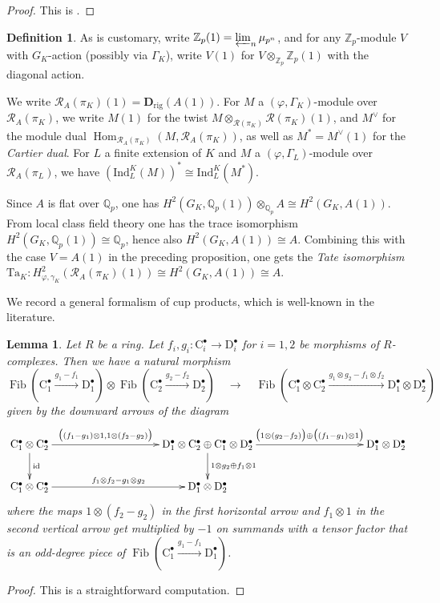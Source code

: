 \documentclass[12pt]{article}
\newtheorem{lemma}[theorem]{Lemma}
\theoremstyle{definition}
\newtheorem{defn}[theorem]{Definition}
\numberwithin{equation}{theorem}
\newcommand{\calR}{\mathcal{R}}
\newcommand{\QQ}{\mathbb{Q}}
\newcommand{\ZZ}{\mathbb{Z}}
\newcommand{\dual}{\vee}
\newcommand{\bbD}{\mathbf{D}}
\newcommand{\rmC}{\mathrm{C}}
\newcommand{\rmD}{\mathrm{D}}
\newcommand{\id}{\mathrm{id}}
\newcommand{\Ind}{\mathrm{Ind}}
\def\Qp{\QQ_p}
\newcommand{\rig}{\mathrm{rig}}
\newcommand{\Ta}{\mathrm{Ta}}
\newcommand{\Zp}{\ZZ_p}
\DeclareMathOperator{\Fib}{Fib}
\DeclareMathOperator{\Hom}{Hom}
\begin{document}
\begin{proof}
This is \cite[Theorem~2.8]{pottharst1}.
\end{proof}

\begin{defn}
As is customary, write $\Zp(1) = \varprojlim_n \mu_{p^n}$, and for any
$\Zp$-module $V$ with $G_K$-action (possibly via $\Gamma_K$), write
$V(1)$ for $V \otimes_{\Zp} \Zp(1)$ with the diagonal action.

We write $\calR_A(\pi_K)(1) = \bbD_\rig(A(1))$.  For $M$ a $(\varphi,
\Gamma_K)$-module over $\calR_A(\pi_K)$, we write $M(1)$ for the twist
$M \otimes_{\calR(\pi_K)} \calR(\pi_K)(1)$, and $M^\dual$ for the
module dual $\Hom_{\calR_A(\pi_K)}(M, \calR_A(\pi_K))$, as well as
$M^* = M^\dual(1)$ for the \emph{Cartier dual}.  For $L$ a finite
extension of $K$ and $M$ a $(\varphi, \Gamma_L)$-module over
$\calR_A(\pi_L)$, we have $(\Ind_L^K(M))^* \cong \Ind_L^K(M^*)$.

Since $A$ is flat over $\Qp$, one has $H^2(G_K,\Qp(1)) \otimes_{\Qp} A
\cong H^2(G_K,A(1))$.  From local class field theory one has the trace
isomorphism $H^2(G_K,\Qp(1)) \cong \Qp$, hence also $H^2(G_K,A(1))
\cong A$.  Combining this with the case $V = A(1)$ in the preceding
proposition, one gets the \emph{Tate isomorphism} $\Ta_K:
H^2_{\varphi,\gamma_K}(\calR_A(\pi_K)(1)) \cong H^2(G_K,A(1)) \cong
A$.
\end{defn}

We record a general formalism of cup products, which is well-known in the literature.

\begin{lemma}
\label{L:cup product}
Let $R$ be a ring.  Let $f_i, g_i: \rmC_i^\bullet \to \rmD_i^\bullet$ for $i = 1,2$ be morphisms of $R$-complexes.  Then we have a natural morphism 
\[
\Fib(\rmC_1^\bullet \xrightarrow{g_1 - f_1} \rmD_1^\bullet) \otimes \Fib(\rmC_2^\bullet \xrightarrow{g_2 - f_2} \rmD_2^\bullet) \quad \longrightarrow \quad \Fib(\rmC_1^\bullet \otimes \rmC_2^\bullet \xrightarrow{g_1 \otimes g_2 - f_1 \otimes f_2} \rmD_1^\bullet \otimes \rmD_2^\bullet)
\]
given by the downward arrows of the diagram
\[
\xymatrix@C=3.5cm{
\rmC_1^\bullet \otimes \rmC_2^\bullet \ar[r]^-{\big((f_1-g_1) \otimes 1 , 1 \otimes (f_2 -g_2)\big)} \ar[d]^{\id} & \rmD_1^\bullet \otimes \rmC_2^\bullet \oplus \rmC_1^\bullet \otimes \rmD_2^\bullet \ar[r]^-{\big(1 \otimes (g_2-f_2)\big) \oplus \big((f_1 - g_1) \otimes 1\big)} \ar[d]^{1 \otimes g_2 \oplus f_1 \otimes 1  } & \rmD_1^\bullet \otimes \rmD_2^\bullet\\
\rmC_1^\bullet \otimes \rmC_2^\bullet
\ar[r]^{f_1\otimes f_2 - g_1 \otimes g_2}
& \rmD_1^\bullet \otimes \rmD_2^\bullet
}
\]
where the maps $1 \otimes (f_2-g_2)$ in the first horizontal arrow and
$f_1 \otimes 1$ in the second vertical arrow get multiplied by $-1$ on
summands with a tensor factor that is an odd-degree piece of
$\Fib(\rmC_1^\bullet \xrightarrow{g_1-f_1} \rmD_1^\bullet)$.
\end{lemma}
\begin{proof}
This is a straightforward computation.
\end{proof}
\end{document}
